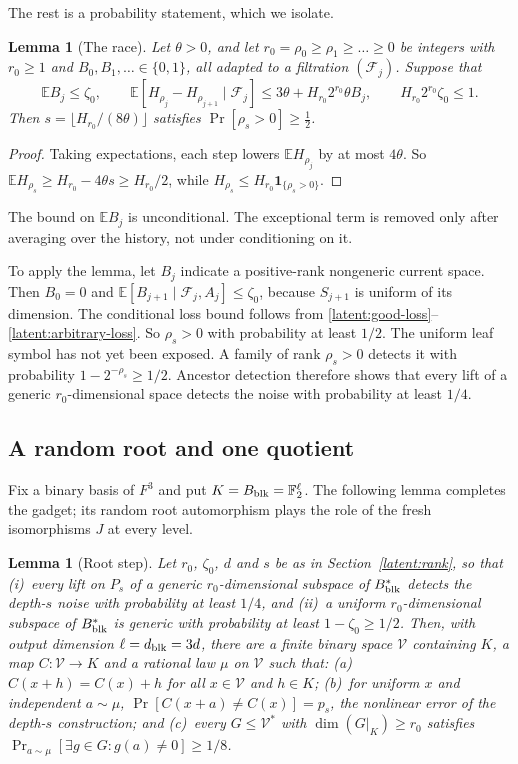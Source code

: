 \documentclass[11pt]{article}
\newtheorem{lemma}[theorem]{Lemma}
\newcommand{\E}{\mathbb E}
\newcommand{\F}{\mathbb F}
\newcommand{\ind}{\mathbf 1}
\begin{document}
The rest is a probability statement, which we isolate.

\begin{lemma}[The race]\label{lem:race}
Let $\theta>0$, and let $r_0=\rho_0\ge\rho_1\ge\dots\ge0$ be integers with
$r_0\ge1$ and $B_0,B_1,\ldots\in\{0,1\}$, all adapted to a filtration
$(\mathcal F_j)$. Suppose that
\[
 \E B_j\le\zeta_0,\qquad
 \E[H_{\rho_j}-H_{\rho_{j+1}}\mid\mathcal F_j]\le3\theta+H_{r_0}2^{r_0}\theta B_j,
 \qquad H_{r_0}2^{r_0}\zeta_0\le1.
\]
Then $s=\lfloor H_{r_0}/(8\theta)\rfloor$ satisfies $\Pr[\rho_s>0]\ge\frac12$.
\end{lemma}

\begin{proof}
Taking expectations, each step lowers $\E H_{\rho_j}$ by at most $4\theta$.
So $\E H_{\rho_s}\ge H_{r_0}-4\theta s\ge H_{r_0}/2$, while
$H_{\rho_s}\le H_{r_0}\ind_{\{\rho_s>0\}}$.
\end{proof}

\noindent The bound on $\E B_j$ is unconditional. The exceptional term is
removed only after averaging over the history, not under conditioning on it.

To apply the lemma, let $B_j$ indicate a positive-rank nongeneric current
space. Then $B_0=0$ and $\E[B_{j+1}\mid\mathcal F_j,A_j]\le\zeta_0$,
because $S_{j+1}$ is uniform of its dimension. The conditional loss bound
follows from \eqref{latent:good-loss}--\eqref{latent:arbitrary-loss}.
So $\rho_s>0$ with probability at least $1/2$.
The uniform leaf symbol has not yet been exposed. A family of rank
$\rho_s>0$ detects it with probability $1-2^{-\rho_s}\ge1/2$.
Ancestor detection therefore shows that every lift of a generic
$r_0$-dimensional space detects the noise with probability at least $1/4$.

\subsection{A random root and one quotient}

Fix a binary basis of $F^3$ and put $K=B_{\rm blk}=\F_2^{\ell}$. The
following lemma completes the gadget; its random root automorphism plays
the role of the fresh isomorphisms $J$ at every level.

\begin{lemma}[Root step]\label{lem:root}
Let $r_0$, $\zeta_0$, $d$ and $s$ be as in Section~\ref{latent:rank}, so
that (i)~every lift on $P_s$ of a generic $r_0$-dimensional subspace of
$B_{\rm blk}^*$ detects the depth-$s$ noise with probability at least
$1/4$, and (ii)~a uniform $r_0$-dimensional subspace of $B_{\rm blk}^*$
is generic with probability at least $1-\zeta_0\ge1/2$. Then, with output
dimension $\ell=d_{\rm blk}=3d$, there are a finite binary space
$\mathcal V$ containing $K$, a map $C:\mathcal V\to K$ and a rational law
$\mu$ on $\mathcal V$ such that:
(a)~$C(x+h)=C(x)+h$ for all $x\in\mathcal V$ and $h\in K$;
(b)~for uniform $x$ and independent $a\sim\mu$,
$\Pr[C(x+a)\ne C(x)]=p_s$, the nonlinear error of the depth-$s$
construction; and
(c)~every $G\le\mathcal V^*$ with $\dim(G|_K)\ge r_0$ satisfies
$\Pr_{a\sim\mu}[\exists g\in G:g(a)\ne0]\ge1/8$.
\end{lemma}
\end{document}
